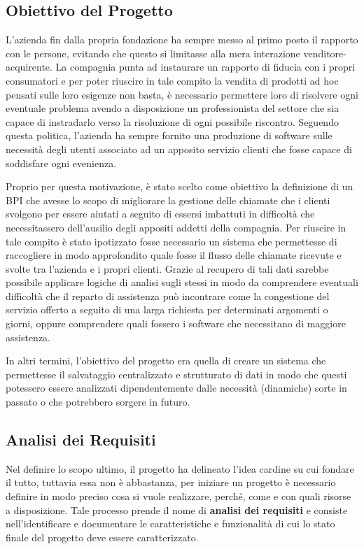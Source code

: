 \subsection{Obiettivo del Progetto}

L'azienda fin dalla propria fondazione ha sempre messo al primo posto il rapporto con le persone, evitando che questo si limitasse alla mera interazione venditore-acquirente. La compagnia punta ad instaurare un rapporto di fiducia con i propri consumatori e per poter riuscire in tale compito la vendita di prodotti ad hoc pensati sulle loro esigenze non basta, è necessario permettere loro di risolvere ogni eventuale problema avendo a disposizione un professionista del settore che sia capace di instradarlo verso la risoluzione di ogni possibile riscontro. Seguendo questa politica, l'azienda ha sempre fornito una produzione di software sulle necessità degli utenti associato ad un apposito servizio clienti che fosse capace di soddisfare ogni evenienza.

Proprio per questa motivazione, è stato scelto come obiettivo la definizione di un BPI che avesse lo scopo di migliorare la gestione delle chiamate che i clienti svolgono per essere aiutati a seguito di essersi imbattuti in difficoltà che necessitassero dell'ausilio degli appositi addetti della compagnia. Per riuscire in tale compito è stato ipotizzato fosse necessario un sistema che permettesse di raccogliere in modo approfondito quale fosse il flusso delle chiamate ricevute e svolte tra l'azienda e i propri clienti. Grazie al recupero di tali dati sarebbe possibile applicare logiche di analisi sugli stessi in modo da comprendere eventuali difficoltà che il reparto di assistenza può incontrare come la congestione del servizio offerto a seguito di una larga richiesta per determinati argomenti o giorni, oppure comprendere quali fossero i software che necessitano di maggiore assistenza.

In altri termini, l'obiettivo del progetto era quella di creare un sistema che permettesse il salvataggio centralizzato e strutturato di dati in modo che questi potessero essere analizzati dipendentemente dalle necessità (dinamiche) sorte in passato o che potrebbero sorgere in futuro.

\subsection{Analisi dei Requisiti}

Nel definire lo scopo ultimo, il progetto ha delineato l'idea cardine su cui fondare il tutto, tuttavia essa non è abbastanza, per iniziare un progetto è necessario definire in modo preciso cosa si vuole realizzare, perché, come e con quali risorse a disposizione. Tale processo prende il nome di \textbf{analisi dei requisiti} e consiste nell'identificare e documentare le caratteristiche e funzionalità di cui lo stato finale del progetto deve essere caratterizzato.

